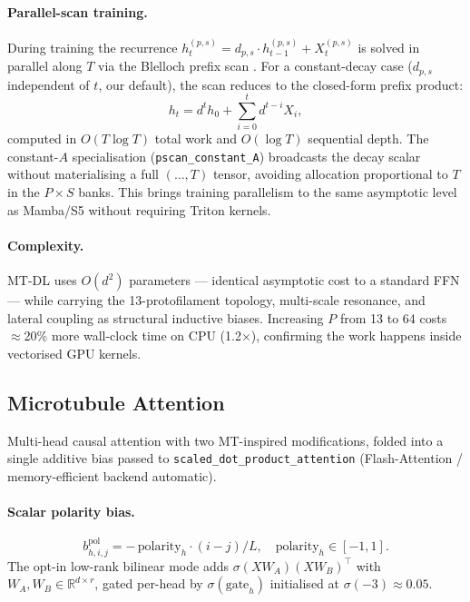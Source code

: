 \documentclass[11pt]{article}
\theoremstyle{definition}
\newcommand{\RR}{\mathbb{R}}
\newcommand{\sigmoid}{\sigma}
\begin{document}
\paragraph{Parallel-scan training.}
During training the recurrence $h_t^{(p,s)} = d_{p,s}\cdot h_{t-1}^{(p,s)} + X_t^{(p,s)}$ is solved in parallel along $T$ via the Blelloch prefix scan \citep{blelloch1990prefix}. For a constant-decay case ($d_{p,s}$ independent of $t$, our default), the scan reduces to the closed-form prefix product:
\begin{equation}
  h_t = d^t h_0 + \sum_{i=0}^{t} d^{t-i} X_i,
  \label{eq:pscan}
\end{equation}
computed in $O(T\log T)$ total work and $O(\log T)$ sequential depth. The constant-$A$ specialisation (\texttt{pscan\_constant\_A}) broadcasts the decay scalar without materialising a full $({\ldots}, T)$ tensor, avoiding allocation proportional to $T$ in the $P{\times}S$ banks. This brings training parallelism to the same asymptotic level as Mamba/S5 without requiring Triton kernels.

\paragraph{Complexity.}
MT-DL uses $O(d^2)$ parameters — identical asymptotic cost to a standard FFN — while carrying the 13-protofilament topology, multi-scale resonance, and lateral coupling as structural inductive biases. Increasing $P$ from 13 to 64 costs $\approx$20\% more wall-clock time on CPU (1.2$\times$), confirming the work happens inside vectorised GPU kernels.

\subsection{Microtubule Attention}
\label{sec:attn}

Multi-head causal attention with two MT-inspired modifications, folded into a single additive bias passed to \texttt{scaled\_dot\_product\_attention} (Flash-Attention / memory-efficient backend automatic).

\paragraph{Scalar polarity bias.}
\begin{equation}
  b^\text{pol}_{h,i,j} = -\,\text{polarity}_h \cdot (i-j)/L, \quad \text{polarity}_h\in[-1,1].
\end{equation}
The opt-in low-rank bilinear mode adds $\sigmoid(XW_A)(XW_B)^\top$ with $W_A,W_B\in\RR^{d\times r}$, gated per-head by $\sigmoid(\text{gate}_h)$ initialised at $\sigmoid(-3)\approx 0.05$.
\end{document}
